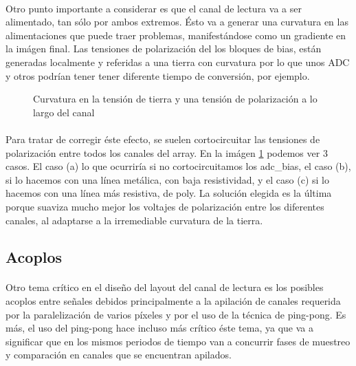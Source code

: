 \paragraph{}
Otro punto importante a considerar es que el canal de lectura va a ser alimentado,
tan sólo por ambos extremos. Ésto va a generar una curvatura en las alimentaciones
que puede traer problemas, manifestándose como un gradiente en la imágen final.
Las tensiones de polarización del los bloques de bias, están generadas localmente
y referidas a una tierra con curvatura por lo que unos ADC y otros
podrían tener tener diferente tiempo de conversión, por ejemplo.

\begin{figure}[h]
	
	\caption{Curvatura en la tensión de tierra y una tensión de polarización a lo largo del canal}
	\label{fig:adc_poly_short}
\end{figure}

\paragraph{}
Para tratar de corregir éste efecto, se suelen cortocircuitar las tensiones de polarización
entre todos los canales del array. En la imágen \ref{fig:adc_poly_short} podemos ver
3 casos. El caso (a) lo que ocurriría si no cortocircuitamos los adc\_bias,
el caso (b), si lo hacemos con una línea metálica, con baja resistividad,
y el caso (c) si lo hacemos con una línea más resistiva, de poly.
La solución elegida es la última porque suaviza mucho mejor los voltajes de polarización
entre los diferentes canales, al adaptarse a la irremediable curvatura de la tierra.

\subsection{Acoplos}

\paragraph{}
Otro tema crítico en el diseño del layout del canal de lectura es los posibles acoplos
entre señales debidos principalmente a la apilación de canales requerida por la
paralelización de varios píxeles y por el uso de la técnica de ping-pong. Es más,
el uso del ping-pong hace incluso más crítico éste tema, ya que va a significar
que en los mismos periodos de tiempo van a concurrir fases de muestreo y comparación
en canales que se encuentran apilados.

